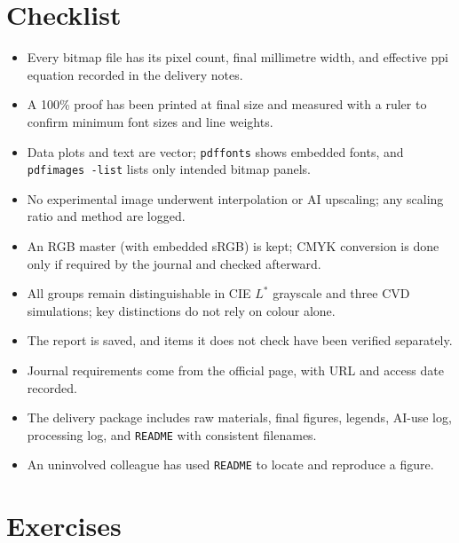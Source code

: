 \section{Checklist}

\begin{itemize}
\item Every bitmap file has its pixel count, final millimetre width, and effective ppi equation recorded in the delivery notes.
\item A 100\% proof has been printed at final size and measured with a ruler to confirm minimum font sizes and line weights.
\item Data plots and text are vector; \texttt{pdffonts} shows embedded fonts, and \texttt{pdfimages -list} lists only intended bitmap panels.
\item No experimental image underwent interpolation or AI upscaling; any scaling ratio and method are logged.
\item An RGB master (with embedded sRGB) is kept; CMYK conversion is done only if required by the journal and checked afterward.
\item All groups remain distinguishable in CIE $L^*$ grayscale and three CVD simulations; key distinctions do not rely on colour alone.
\item The  report is saved, and items it does not check have been verified separately.
\item Journal requirements come from the official page, with URL and access date recorded.
\item The delivery package includes raw materials, final figures, legends, AI-use log, processing log, and \texttt{README} with consistent filenames.
\item An uninvolved colleague has used \texttt{README} to locate and reproduce a figure.
\end{itemize}

\section{Exercises}

